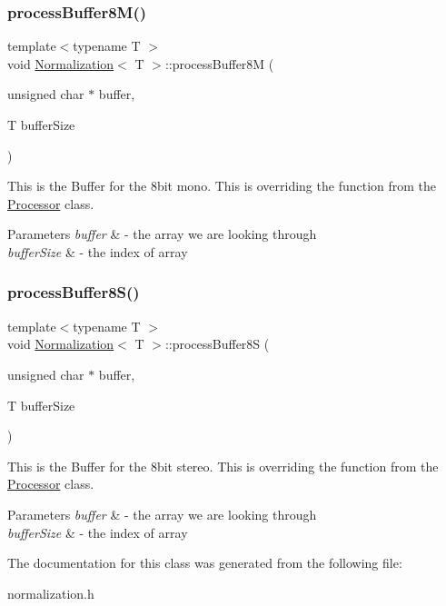 \subsubsection{\texorpdfstring{process\+Buffer8\+M()}{processBuffer8M()}}
{\footnotesize\ttfamily template$<$typename T $>$ \\
void \hyperlink{classNormalization}{Normalization}$<$ T $>$\+::process\+Buffer8M (\begin{DoxyParamCaption}\item[{unsigned char $\ast$}]{buffer,  }\item[{T}]{buffer\+Size }\end{DoxyParamCaption})\hspace{0.3cm}{\ttfamily [override]}}

This is the Buffer for the 8bit mono. This is overriding the function from the \hyperlink{classProcessor}{Processor} class. 
\begin{DoxyParams}{Parameters}
{\em buffer} & -\/ the array we are looking through \\
\hline
{\em buffer\+Size} & -\/ the index of array \\
\hline
\end{DoxyParams}
\mbox{\label{classNormalization_a7cc8c3dd949989fc6da01ab6b76ddf9e}} 
\subsubsection{\texorpdfstring{process\+Buffer8\+S()}{processBuffer8S()}}
{\footnotesize\ttfamily template$<$typename T $>$ \\
void \hyperlink{classNormalization}{Normalization}$<$ T $>$\+::process\+Buffer8S (\begin{DoxyParamCaption}\item[{unsigned char $\ast$}]{buffer,  }\item[{T}]{buffer\+Size }\end{DoxyParamCaption})\hspace{0.3cm}{\ttfamily [override]}}

This is the Buffer for the 8bit stereo. This is overriding the function from the \hyperlink{classProcessor}{Processor} class. 
\begin{DoxyParams}{Parameters}
{\em buffer} & -\/ the array we are looking through \\
\hline
{\em buffer\+Size} & -\/ the index of array \\
\hline
\end{DoxyParams}


The documentation for this class was generated from the following file\+:\begin{DoxyCompactItemize}
\item 
normalization.\+h\end{DoxyCompactItemize}
